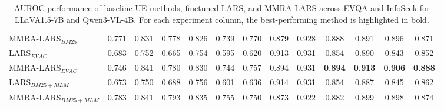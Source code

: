 \begin{table}[t]
\begin{tabular}{l|cccccc|cccccc}
MMRA-LARS$_{BM25}$ & 0.771 & 0.831 & 0.778 & 0.826 & 0.739 & 0.770 & 0.879 & 0.928 & 0.888 & 0.891 & 0.896 & 0.871 \\
LARS$_{EVAC}$ & 0.683 & 0.752 & 0.665 & 0.754 & 0.595 & 0.620 & 0.913 & 0.931 & 0.854 & 0.890 & 0.843 & 0.852 \\
MMRA-LARS$_{EVAC}$ & 0.746 & 0.841 & 0.780 & 0.830 & 0.744 & 0.757 & 0.894 & 0.931 & \textbf{0.894} & \textbf{0.913} & \textbf{0.906} & \textbf{0.888} \\
LARS$_{BM25+MLM}$ & 0.673 & 0.750 & 0.688 & 0.756 & 0.601 & 0.636 & 0.914 & 0.931 & 0.854 & 0.887 & 0.845 & 0.862 \\
MMRA-LARS$_{BM25+MLM}$ & 0.783 & 0.841 & 0.793 & 0.835 & 0.755 & 0.750 & 0.873 & 0.922 & 0.882 & 0.899 & 0.898 & 0.874 \\
\hline
\end{tabular}
\caption{AUROC performance of baseline UE methods, finetuned LARS, and MMRA-LARS across EVQA and InfoSeek for LLaVA1.5-7B and Qwen3-VL-4B. For each experiment column, the best-performing method is highlighted in bold.}
\label{tab:uq_performance_all}
\end{table}



